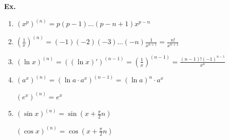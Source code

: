 \documentclass[14pt, letter paper]{article}
\begin{document}
\textbf{Ex.} \begin{enumerate}
    \item $(x^p)^{(n)} = p(p - 1)...(p - n + 1)x^{p - n}$
    \item $(\frac{1}{x})^{(n)} = (-1)(-2)(-3)...(-n)\frac{1}{x^{n + 1}} = \frac{n!}{x^{n + 1}}$
    \item $(\ln{x})^{(n)} = ((\ln{x})')^{(n - 1)} = (\frac{1}{x})^{(n - 1)} = \frac{(n - 1)!(-1)^{n - 1}}{x^n}$
    \item $(a^x)^{(n)} = (\ln{a} \cdot a^x)^{(n - 1)} = (\ln{a})^n \cdot a^x$
    
    $(e^x)^{(n)} = e^x$

    \item $(\sin{x})^{(n)} = \sin{(x + \frac{\pi}{2}n)}$
    
    $(\cos{x})^{(n)} = \cos{(x + \frac{\pi}{2}n)}$
\end{enumerate}
\end{document}
